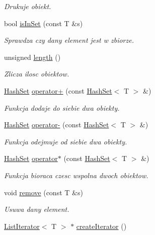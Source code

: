 \begin{DoxyCompactItemize}
\begin{DoxyCompactList}\small\item\em Drukuje obiekt. \end{DoxyCompactList}\item 
bool \hyperlink{class_hash_set_a6615eac8096b3ba6cdf6c2803cde786b}{is\+In\+Set} (const T \&s)\hypertarget{class_hash_set_a6615eac8096b3ba6cdf6c2803cde786b}{}\label{class_hash_set_a6615eac8096b3ba6cdf6c2803cde786b}

\begin{DoxyCompactList}\small\item\em Sprawdza czy dany element jest w zbiorze. \end{DoxyCompactList}\item 
unsigned \hyperlink{class_hash_set_aafd311c4cd17f5c3426c97dd3e226868}{length} ()
\begin{DoxyCompactList}\small\item\em Zlicza ilosc obiektow. \end{DoxyCompactList}\item 
\hyperlink{class_hash_set}{Hash\+Set} \hyperlink{class_hash_set_a08da209c1df7dbb7b5492795aa56dbae}{operator+} (const \hyperlink{class_hash_set}{Hash\+Set}$<$ T $>$ \&)
\begin{DoxyCompactList}\small\item\em Funkcja dodaje do siebie dwa obiekty. \end{DoxyCompactList}\item 
\hyperlink{class_hash_set}{Hash\+Set} \hyperlink{class_hash_set_a3abdaa3b3d16eb3482a172145fe52cf9}{operator-\/} (const \hyperlink{class_hash_set}{Hash\+Set}$<$ T $>$ \&)
\begin{DoxyCompactList}\small\item\em Funkcja odejmuje od siebie dwa obiekty. \end{DoxyCompactList}\item 
\hyperlink{class_hash_set}{Hash\+Set} \hyperlink{class_hash_set_af00b260b513c99b3e54fecdd2ef32951}{operator$\ast$} (const \hyperlink{class_hash_set}{Hash\+Set}$<$ T $>$ \&)
\begin{DoxyCompactList}\small\item\em Funkcja bioraca czesc wspolna dwoch obiektow. \end{DoxyCompactList}\item 
void \hyperlink{class_hash_set_a2aa365ab46b522eb79053bafda263eb5}{remove} (const T \&s)
\begin{DoxyCompactList}\small\item\em Usuwa dany element. \end{DoxyCompactList}\item 
\hyperlink{class_list_iterator}{List\+Iterator}$<$ T $>$ $\ast$ \hyperlink{class_hash_set_ae705473c488464356c8464fbce05c7ee}{create\+Iterator} ()\hypertarget{class_hash_set_ae705473c488464356c8464fbce05c7ee}{}\label{class_hash_set_ae705473c488464356c8464fbce05c7ee}


\end{DoxyCompactItemize}
